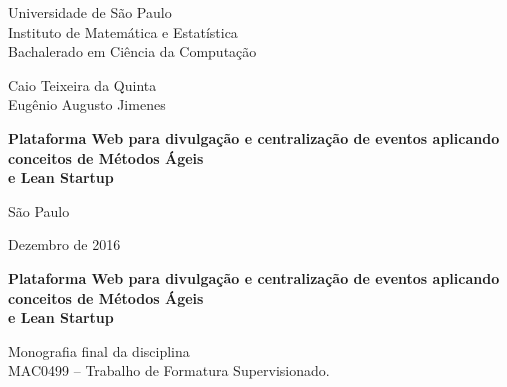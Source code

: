 \documentclass[12pt,twoside,a4paper]{book}
\begin{document}
\frontmatter
\fancyhead[RO]{{\footnotesize\rightmark}\hspace{2em}\thepage}
\setcounter{tocdepth}{2}
\fancyhead[LE]{\thepage\hspace{2em}\footnotesize{\leftmark}}
\fancyhead[RE,LO]{}
\fancyhead[RO]{{\footnotesize\rightmark}\hspace{2em}\thepage}

\onehalfspacing  %

\thispagestyle{empty}
\begin{center}
    \vspace*{2.3cm}
    Universidade de São Paulo\\
    Instituto de Matemática e Estatística\\
    Bachalerado em Ciência da Computação


    \vspace*{3cm}
    \Large Caio Teixeira da Quinta \\ Eugênio Augusto Jimenes


    \vspace{3cm}
    \textbf{\Large{Plataforma Web para divulgação e centralização de eventos aplicando conceitos de Métodos Ágeis \\ e Lean Startup }}


    \vskip 5cm
    \normalsize{São Paulo}

    \normalsize{Dezembro de 2016}
\end{center}

%
\newpage
\thispagestyle{empty}
    \begin{center}
        \vspace*{2.3 cm}
        \textbf{\Large{Plataforma Web para divulgação e centralização de eventos aplicando conceitos de Métodos Ágeis \\ e Lean Startup }}
        \vspace*{2 cm}
    \end{center}

    \vskip 2cm

    \begin{flushright}
    Monografia final da disciplina \\
        MAC0499 -- Trabalho de Formatura Supervisionado.
    \end{flushright}
\end{document}
